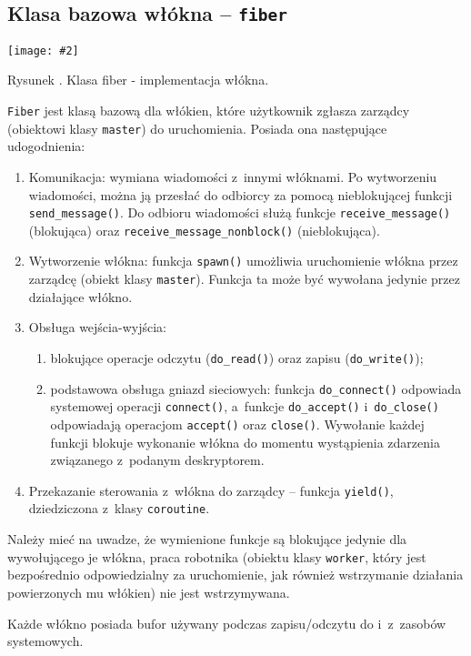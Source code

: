 \documentclass[12pt]{mwart}
\newcommand{\code}{\texttt}
\newcommand{\procbr}{()}
\newcommand{\function}[1]{\code{#1\procbr}}
\newcounter{figmain}
\newcommand{\myownfigure}[4]{ \newcounter{#1} \setcounter{#1}{\value{figmain}} \addtocounter{figmain}{1} \begin{center} \label{fig:#1} \centering \texttt{[image: \#2]}\\ \nopagebreak[5] \parbox[t]{11.5cm}{Rysunek \arabic{#1}. #3.} \end{center}}
\begin{document}
\subsection{Klasa bazowa włókna -- \code{fiber}}
\label{sec:fibersClass}
    \myownfigure{Fiber}{Fiber.png}{Klasa fiber - implementacja włókna}{.7}
%
\indent
  \code{Fiber} jest klasą bazową dla włókien, które użytkownik zgłasza zarządcy (obiektowi klasy \code{master}) do uruchomienia.
  Posiada ona następujące udogodnienia:
  \begin{enumerate}
    \item Komunikacja: wymiana wiadomości z~innymi włóknami. Po wytworzeniu wiadomości, można ją przesłać do odbiorcy za pomocą nieblokującej funkcji \function{send\_message}.
    Do odbioru wiadomości służą funkcje \linebreak \function{receive\_message} (blokująca) oraz \function{receive\_message\_nonblock} (nieblokująca).
    \item Wytworzenie włókna: funkcja \function{spawn} umożliwia uruchomienie włókna przez zarządcę (obiekt klasy \code{master}). Funkcja ta może być wywołana jedynie
      przez działające włókno.
    \item Obsługa wejścia-wyjścia:
      \begin{enumerate}
        \item blokujące operacje odczytu (\function{do\_read}) oraz zapisu (\function{do\_write});
        \item podstawowa obsługa gniazd sieciowych: funkcja \function{do\_connect} odpowiada systemowej operacji \function{connect}, a~funkcje \function{do\_accept} 
          \linebreak i~\function{do\_close} odpowiadają operacjom \function{accept} oraz \function{close}. Wywołanie każdej funkcji blokuje wykonanie włókna do momentu wystąpienia  
          zdarzenia związanego z~podanym deskryptorem.
      \end{enumerate}
    \item Przekazanie sterowania z~włókna do zarządcy -- funkcja \function{yield}, dziedziczona z~klasy \code{coroutine}.
  \end{enumerate}
  Należy mieć na uwadze, że wymienione funkcje są blokujące jedynie dla wywołującego je włókna, praca robotnika (obiektu klasy \code{worker}, 
  który jest bezpośrednio odpowiedzialny za uruchomienie, jak również wstrzymanie działania powierzonych mu włókien) nie jest wstrzymywana.
\par
\indent
  Każde włókno posiada bufor używany podczas zapisu/odczytu do i~z~zasobów systemowych. 
\end{document}
